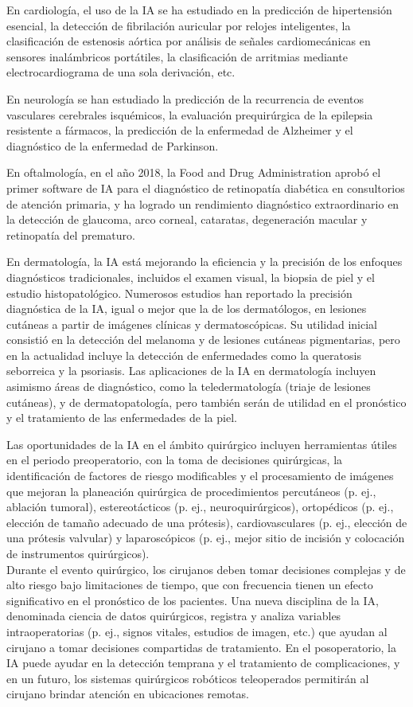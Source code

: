 \documentclass[10pt]{article}
\begin{document}
    
    En cardiología, el uso de la IA se ha estudiado en la predicción de hipertensión esencial, la detección de fibrilación auricular por relojes inteligentes, la clasificación de estenosis aórtica por análisis de señales cardiomecánicas en sensores inalámbricos portátiles, la clasificación de arritmias mediante electrocardiograma de una sola derivación, etc.
    
    
    En neurología se han estudiado la predicción de la recurrencia de eventos vasculares cerebrales isquémicos, la evaluación prequirúrgica de la epilepsia resistente a fármacos, la predicción de la enfermedad de Alzheimer y el diagnóstico de la enfermedad de Parkinson.
   
    
    En oftalmología, en el año 2018, la Food and Drug Administration aprobó el primer software de IA para el diagnóstico de retinopatía diabética en consultorios de atención primaria, y ha logrado un rendimiento diagnóstico extraordinario en la detección de glaucoma, arco corneal, cataratas, degeneración macular y retinopatía del prematuro.
    
    
    En dermatología, la IA está mejorando la eficiencia y la precisión de los enfoques diagnósticos tradicionales, incluidos el examen visual, la biopsia de piel y el estudio histopatológico. Numerosos estudios han reportado la precisión diagnóstica de la IA, igual o mejor que la de los dermatólogos, en lesiones cutáneas a partir de imágenes clínicas y dermatoscópicas. Su utilidad inicial consistió en la detección del melanoma y de lesiones cutáneas pigmentarias, pero en la actualidad incluye la detección de enfermedades como la queratosis seborreica y la psoriasis. Las aplicaciones de la IA en dermatología incluyen asimismo áreas de diagnóstico, como la teledermatología (triaje de lesiones cutáneas), y de dermatopatología, pero también serán de utilidad en el pronóstico y el tratamiento de las enfermedades de la piel.
    
    
    Las oportunidades de la IA en el ámbito quirúrgico incluyen herramientas útiles en el periodo preoperatorio, con la toma de decisiones quirúrgicas, la identificación de factores de riesgo modificables y el procesamiento de imágenes que mejoran la planeación quirúrgica de procedimientos percutáneos (p. ej., ablación tumoral), estereotácticos (p. ej., neuroquirúrgicos), ortopédicos (p. ej., elección de tamaño adecuado de una prótesis), cardiovasculares (p. ej., elección de una prótesis valvular) y laparoscópicos (p. ej., mejor sitio de incisión y colocación de instrumentos quirúrgicos).
    \\Durante el evento quirúrgico, los cirujanos deben tomar decisiones complejas y de alto riesgo bajo limitaciones de tiempo, que con frecuencia tienen un efecto significativo en el pronóstico de los pacientes. Una nueva disciplina de la IA, denominada ciencia de datos quirúrgicos, registra y analiza variables intraoperatorias (p. ej., signos vitales, estudios de imagen, etc.) que ayudan al cirujano a tomar decisiones compartidas de tratamiento. En el posoperatorio, la IA puede ayudar en la detección temprana y el tratamiento de complicaciones, y en un futuro, los sistemas quirúrgicos robóticos teleoperados permitirán al cirujano brindar atención en ubicaciones remotas.
   
\end{document}
